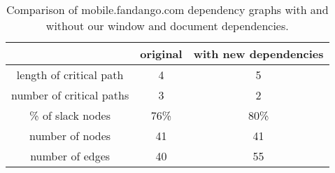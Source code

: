 \begin{table*}[tb]
\centering
\small
\begin{tabular}{|c|c|c|}
\hline
 & original & with new dependencies \\
\hline
length of critical path & 4 & 5 \\
number of critical paths & 3 & 2 \\
\% of slack nodes & 76\% & 80\% \\
number of nodes & 41 & 41 \\
number of edges & 40 & 55 \\
\hline
\end{tabular}\caption{Comparison of mobile.fandango.com dependency graphs with and without our window and document dependencies.}
\label{t:fandangograph}
\end{table*}
